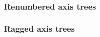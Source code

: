\documentclass[thesis]{subfiles}
\begin{document}
\subsubsection{Renumbered axis trees}

\subsubsection{Ragged axis trees}
\end{document}
